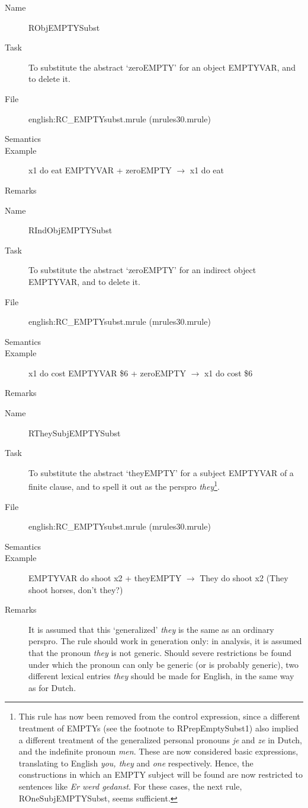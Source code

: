 \begin{description}
\vspace{1 cm}
\begin{description}
\item[Name] RObjEMPTYSubst
\item[Task] To substitute the abstract `zeroEMPTY' for an object EMPTYVAR, 
and to delete it.
\item[File] english:RC\_EMPTYsubst.mrule (mrules30.mrule)
\item[Semantics]
\item[Example] x1 do eat EMPTYVAR + zeroEMPTY $\rightarrow$ x1 do eat
\item[Remarks] 
\end{description}

\vspace{1 cm}
\begin{description}
\item[Name]   RIndObjEMPTYSubst
\item[Task] To substitute the abstract `zeroEMPTY' for an indirect object 
EMPTYVAR, and to delete it.
\item[File] english:RC\_EMPTYsubst.mrule (mrules30.mrule)
\item[Semantics]
\item[Example] x1 do cost EMPTYVAR \$6 + zeroEMPTY $\rightarrow$ x1 do cost \$6
\item[Remarks] 
\end{description}

\vspace{1 cm}
\begin{description}
\item[Name] RTheySubjEMPTYSubst
\item[Task] To substitute the abstract `theyEMPTY' for a subject EMPTYVAR of a 
finite clause, and to spell it out as the perspro {\em they\/}\footnote{This 
rule has now been removed from the control expression, since a different 
treatment of EMPTYs (see the footnote to RPrepEmptySubst1) also implied a 
different treatment of the generalized 
personal pronouns {\em je\/} and {\em ze\/} in Dutch, and the indefinite 
pronoun {\em men\/}. These are now considered 
basic expressions, translating to English {\em you, they\/} and {\em one\/} 
respectively. Hence, the constructions in which an EMPTY subject will be found 
are 
now restricted to sentences like {\em Er werd gedanst\/}. For these cases, the 
next rule, ROneSubjEMPTYSubst, seems sufficient.}.
\item[File] english:RC\_EMPTYsubst.mrule (mrules30.mrule)
\item[Semantics]
\item[Example] EMPTYVAR do shoot x2 + theyEMPTY $\rightarrow$ They do shoot x2 
(They shoot horses, don't they?)
\item[Remarks] It is assumed that this `generalized' {\em they\/} is the same 
as an ordinary perspro. The rule should work in generation only: in analysis, 
it is assumed that the pronoun {\em they\/} is not generic. Should severe 
restrictions be found under which the pronoun can only be generic (or is 
probably generic), two different lexical entries {\em they\/} should be made 
for English, in the same way as for Dutch. 


\end{description}
\end{description}
